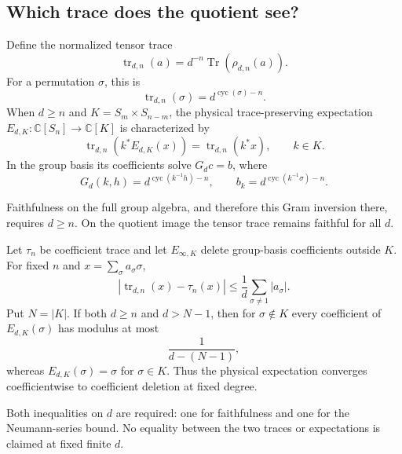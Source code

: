 \subsection{Which trace does the quotient see?}

\begin{definition}
Define the normalized tensor trace
\[
 \operatorname{tr}_{d,n}(a)=d^{-n}\operatorname{Tr}(\rho_{d,n}(a)).
\]
For a permutation $\sigma$, this is
\[
 \operatorname{tr}_{d,n}(\sigma)=d^{\operatorname{cyc}(\sigma)-n}.
\]
When $d\geq n$ and $K=S_m\times S_{n-m}$, the physical trace-preserving
expectation $E_{d,K}:\mathbb C[S_n]\to\mathbb C[K]$ is characterized by
\[
 \operatorname{tr}_{d,n}(k^*E_{d,K}(x))
 =\operatorname{tr}_{d,n}(k^*x),\qquad k\in K.
\]
In the group basis its coefficients solve $G_dc=b$, where
\[
 G_d(k,h)=d^{\operatorname{cyc}(k^{-1}h)-n},\qquad
 b_k=d^{\operatorname{cyc}(k^{-1}\sigma)-n}.
\]
\end{definition}
\begin{scope}
Faithfulness on the full group algebra, and therefore this Gram inversion
there, requires $d\geq n$.  On the quotient image the tensor trace remains
faithful for all $d$.
\end{scope}

\begin{definition}
Let $\tau_n$ be coefficient trace and let $E_{\infty,K}$ delete group-basis
coefficients outside $K$.  For fixed $n$ and
$x=\sum_\sigma a_\sigma\sigma$,
\[
 \left|\operatorname{tr}_{d,n}(x)-\tau_n(x)\right|
 \leq \frac1d\sum_{\sigma\ne1}|a_\sigma|.
\]
Put $N=|K|$.  If both $d\geq n$ and $d>N-1$, then for
$\sigma\notin K$ every coefficient of $E_{d,K}(\sigma)$ has modulus at most
\[
 \frac{1}{d-(N-1)},
\]
whereas $E_{d,K}(\sigma)=\sigma$ for $\sigma\in K$.  Thus the physical
expectation converges coefficientwise to coefficient deletion at fixed
degree.
\end{definition}
\begin{scope}
Both inequalities on $d$ are required: one for faithfulness and one for the
Neumann-series bound.  No equality between the two traces or expectations
is claimed at fixed finite $d$.
\end{scope}


